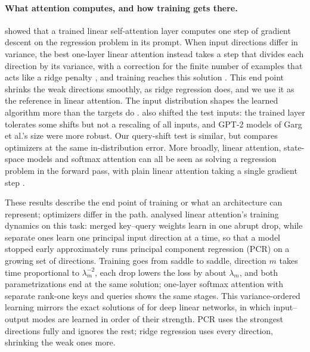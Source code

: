 \documentclass{article}
\begin{document}
\paragraph{What attention computes, and how training gets there.} \citet{vonoswald2023} showed that a trained linear self-attention layer computes one step of gradient descent on the regression problem in its prompt. When input directions differ in variance, the best one-layer linear attention instead takes a step that divides each direction by its variance, with a correction for the finite number of examples that acts like a ridge penalty \citep{ahn2023}, and training reaches this solution \citep{zhang2023trained}. This end point shrinks the weak directions smoothly, as ridge regression does, and we use it as the reference in linear attention. The input distribution shapes the learned algorithm more than the targets do \citep{mahankali2023}. \citet{zhang2023trained} also shifted the test inputs: the trained layer tolerates some shifts but not a rescaling of all inputs, and GPT-2 models of Garg et al.'s size were more robust. Our query-shift test is similar, but compares optimizers at the same in-distribution error. More broadly, linear attention, state-space models and softmax attention can all be seen as solving a regression problem in the forward pass, with plain linear attention taking a single gradient step \citep{wang2025testtime}.

These results describe the end point of training or what an architecture can represent; optimizers differ in the path. \citet{zhang2025training} analysed linear attention's training dynamics on this task: merged key--query weights learn in one abrupt drop, while separate ones learn one principal input direction at a time, so that a model stopped early approximately runs principal component regression (PCR) on a growing set of directions. Training goes from saddle to saddle, direction $m$ takes time proportional to $\lambda_m^{-2}$, each drop lowers the loss by about $\lambda_m$, and both parametrizations end at the same solution; one-layer softmax attention with separate rank-one keys and queries shows the same stages. This variance-ordered learning mirrors the exact solutions of \citet{saxe2014} for deep linear networks, in which input--output modes are learned in order of their strength. PCR uses the strongest directions fully and ignores the rest; ridge regression uses every direction, shrinking the weak ones more.
\end{document}
